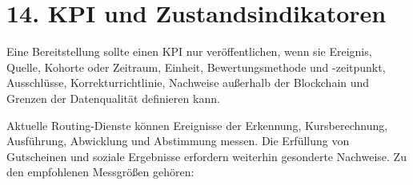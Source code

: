 \documentclass[11pt]{article}
\begin{document}
\section*{14. KPI und Zustandsindikatoren}

Eine Bereitstellung sollte einen KPI nur veröffentlichen, wenn sie Ereignis, Quelle, Kohorte oder Zeitraum, Einheit, Bewertungsmethode und -zeitpunkt, Ausschlüsse, Korrekturrichtlinie, Nachweise außerhalb der Blockchain und Grenzen der Datenqualität definieren kann.

Aktuelle Routing-Dienste können Ereignisse der Erkennung, Kursberechnung, Ausführung, Abwicklung und Abstimmung messen. Die Erfüllung von Gutscheinen und soziale Ergebnisse erfordern weiterhin gesonderte Nachweise. Zu den empfohlenen Messgrößen gehören:
\end{document}
